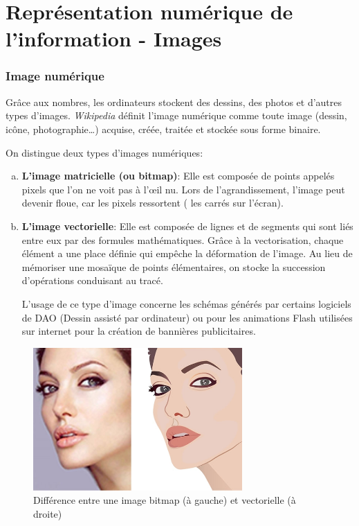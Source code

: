 \documentclass[11pt, a4paper]{book}
\begin{document}
\setcounter{chapter}{1}
\chapter{Représentation numérique de l’information - Images}

\subsection{Image numérique}

Grâce aux nombres, les ordinateurs stockent des dessins, des photos et d’autres types d’images.
{\it Wikipedia} définit l'image numérique  comme toute image (dessin, icône, photographie…) acquise, créée, traitée et stockée sous forme binaire.

On distingue deux types d’images numériques:
\begin{enumerate}[a)]
\item {\bf L'image matricielle (ou bitmap)}:
Elle est composée de points appelés pixels que l’on ne voit pas à l'œil nu. Lors de l’agrandissement, l’image peut devenir floue, car les pixels ressortent ( les carrés sur l’écran).
\item {\bf L'image vectorielle}:
Elle est composée de lignes et de segments qui sont liés entre eux par des formules mathématiques. Grâce à la vectorisation, chaque élément a une place définie qui empêche la déformation de l’image. Au lieu de mémoriser une mosaïque de points élémentaires, on stocke la succession d’opérations conduisant au tracé.

L’usage de ce type d’image concerne les schémas générés par certains logiciels de DAO (Dessin assisté par ordinateur) ou pour les animations Flash utilisées sur internet pour la création de bannières publicitaires.

\end{enumerate}

\begin{center}
\begin{figure}
\centering
\includegraphics[width=8cm]{images/bitmapvectoriel}
\caption{Différence entre une image bitmap (à gauche) et vectorielle (à droite)}
\end{figure}
\end{center}
\end{document}
